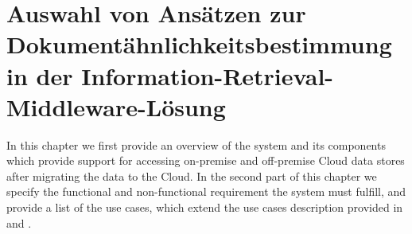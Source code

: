 \chapter{Auswahl von Ansätzen zur Dokumentähnlichkeitsbestimmung in der Information-Retrieval-Middleware-Lösung }
\label{chap:AuswahlAnsätzen}

In this chapter we first provide an overview of the system and its components which provide support for accessing on-premise and off-premise Cloud data stores after migrating the data to the Cloud. In the second part of this chapter we specify the functional and non-functional requirement the system must fulfill, and provide a list of the use cases, which extend the use cases description provided in \cite{Uralov2012} and \cite{Muhler2012}.



